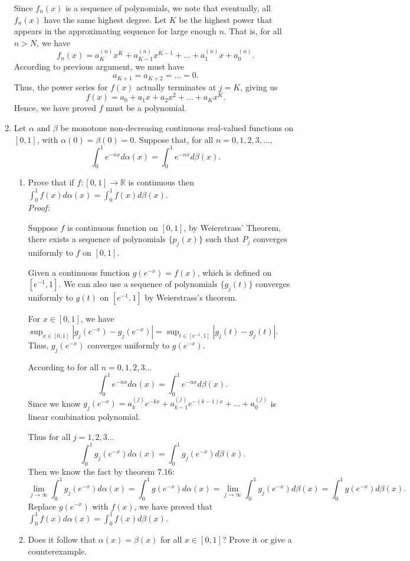 \documentclass[hidelinks]{article}
\begin{document}
\begin{enumerate}
Since $f_n(x)$ is a sequence of polynomials, we note that eventually, all $f_n(x)$ have the same highest degree. Let $K$ be the highest power that appears in the approximating sequence for large enough $n$. That is, for all $n > N$, we have
\[
f_n(x) = a_K^{(n)} x^K + a_{K-1}^{(n)} x^{K-1} + \dots + a_1^{(n)} x + a_0^{(n)}.
\]
According to previous argument, we must have
\[
a_{K+1} = a_{K+2} = \dots = 0.
\]
Thus, the power series for $f(x)$ actually terminates at $j = K$, giving us
\[
f(x) = a_0 + a_1 x + a_2 x^2 + \dots + a_K x^K.
\]
Hence, we have proved $f$ must be a polynomial.





\item
Let $\alpha$ and $\beta$ be monotone non-decreasing continuous real-valued functions on $[0,1]$,
with $\alpha(0)=\beta(0) =0$.
Suppose that, for all $n =0,1,2,3,\ldots$,
\[
    \int_0^1 e^{-nx} d\alpha(x)
    =
    \int_0^1 e^{-nx} d\beta(x).
\]
\begin{enumerate}
\item
Prove that if $f:[0,1]\to \mathbb{R}$ is continuous then $\int_0^1 f(x) d\alpha(x)
= \int_0^1 f(x) d\beta(x)$.
\\

\textit{Proof:} 

Suppose $f$ is continuous function on $[0,1]$, by Weierstrass’ Theorem, there exists a sequence of polynomials $\{p_j(x)\}$ such that $P_j$ converges uniformly to $f$ on $[0,1]$.

Given a continuous function $g(e^{-x})=f(x)$, which is defined on $[e^{-1},1]$. We can also use a sequence of polynomials $\{g_j(t)\}$ converges uniformly to $g(t)$ on $[e^{-1},1]$ by Weierstrass's theorem.

For $x\in [0,1]$, we have $\sup_{x\in[0,1]}|g_j(e^{-x})-g_j(e^{-x})|=\sup_{t\in[e^{-1},1]}|g_j(t)-g_j(t)|$. Thus, $g_j(e^{-x})$ converges uniformly to $g(e^{-x})$.

According to for all $n=0,1,2,3...$
\[
    \int_0^1 e^{-nx} d\alpha(x)
    =
    \int_0^1 e^{-nx} d\beta(x).
\]
Since we know $g_j(e^{-x})=a_k^{(j)}e^{-kx}+a_{k-1}^{(j)}e^{-(k-1)x}+...+a_0^{(j)}$ is linear combination polynomial.

Thus for all $j=1,2,3...$
\[
    \int_0^1 g_j(e^{-x}) d\alpha(x)
    =
    \int_0^1 g_j(e^{-x}) d\beta(x).
\]
Then we know the fact by theorem 7.16:
\[
\lim_{j\to\infty}\int_0^1 g_j(e^{-x}) d\alpha(x)
    =\int_0^1 g(e^{-x}) d\alpha(x)=
    \lim_{j\to\infty}\int_0^1 g_j(e^{-x}) d\beta(x)=\int_0^1 g(e^{-x}) d\beta(x).
\]
Replace $g(e^{-x})$ with $f(x)$, we have proved that $\int_0^1 f(x) d\alpha(x)
= \int_0^1 f(x) d\beta(x)$.
\item
Does it follow that $\alpha(x)=\beta(x)$ for all $x \in [0,1]$?  Prove it or give a
counterexample.
\\


\end{enumerate}
\end{enumerate}
\end{document}
